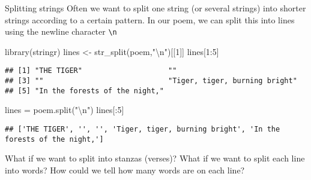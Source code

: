 \documentclass[
  10pt,
  ignorenonframetext,
  aspectratio=169]{beamer}
\newenvironment{Shaded}{\begin{snugshade}}{\end{snugshade}}
\newcommand{\CharTok}[1]{\textcolor[rgb]{0.86,0.64,0.64}{#1}}
\newcommand{\DecValTok}[1]{\textcolor[rgb]{0.86,0.86,0.80}{#1}}
\newcommand{\FunctionTok}[1]{\textcolor[rgb]{0.94,0.94,0.56}{#1}}
\newcommand{\NormalTok}[1]{\textcolor[rgb]{0.80,0.80,0.80}{#1}}
\newcommand{\OperatorTok}[1]{\textcolor[rgb]{0.94,0.94,0.82}{#1}}
\newcommand{\OtherTok}[1]{\textcolor[rgb]{0.94,0.94,0.56}{#1}}
\newcommand{\SpecialCharTok}[1]{\textcolor[rgb]{0.86,0.64,0.64}{#1}}
\newcommand{\StringTok}[1]{\textcolor[rgb]{0.80,0.58,0.58}{#1}}
\begin{document}
\begin{frame}[fragile]{Splitting strings}
\protect\hypertarget{splitting-strings}{}
Often we want to split one string (or several strings) into shorter
strings according to a certain pattern. In our poem, we can split this
into lines using the newline character \texttt{\textbackslash{}n}

\scriptsize

\begin{Shaded}
\begin{Highlighting}[]
\FunctionTok{library}\NormalTok{(stringr)}
\NormalTok{lines }\OtherTok{\textless{}{-}} \FunctionTok{str\_split}\NormalTok{(poem,}\StringTok{"}\SpecialCharTok{\textbackslash{}n}\StringTok{"}\NormalTok{)[[}\DecValTok{1}\NormalTok{]]}
\NormalTok{lines[}\DecValTok{1}\SpecialCharTok{:}\DecValTok{5}\NormalTok{]}
\end{Highlighting}
\end{Shaded}

\begin{verbatim}
## [1] "THE TIGER"                    ""                            
## [3] ""                             "Tiger, tiger, burning bright"
## [5] "In the forests of the night,"
\end{verbatim}

\begin{Shaded}
\begin{Highlighting}[]
\NormalTok{lines }\OperatorTok{=}\NormalTok{ poem.split(}\StringTok{"}\CharTok{\textbackslash{}n}\StringTok{"}\NormalTok{)}
\NormalTok{lines[:}\DecValTok{5}\NormalTok{]}
\end{Highlighting}
\end{Shaded}

\begin{verbatim}
## ['THE TIGER', '', '', 'Tiger, tiger, burning bright', 'In the forests of the night,']
\end{verbatim}

\normalsize

What if we want to split into stanzas (verses)? What if we want to split
each line into words? How could we tell how many words are on each line?
\end{frame}
\end{document}
